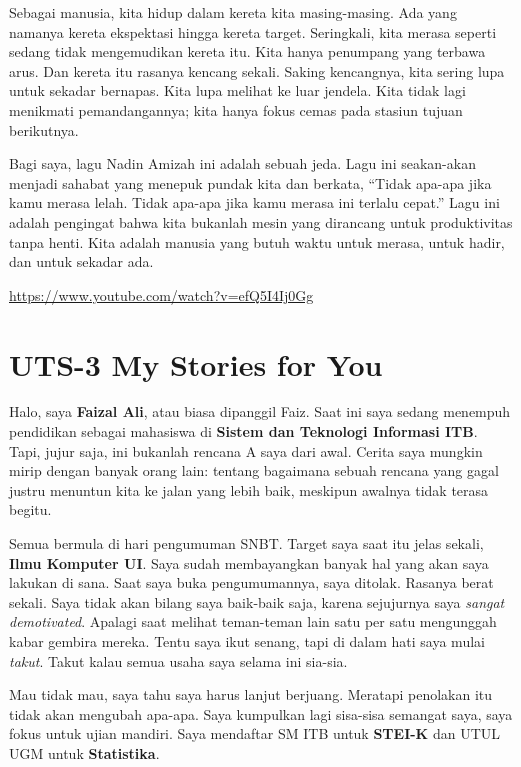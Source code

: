 \documentclass[
  letterpaper,
  DIV=11,
  numbers=noendperiod]{scrreprt}
\begin{document}
Sebagai manusia, kita hidup dalam kereta kita masing-masing. Ada yang
namanya kereta ekspektasi hingga kereta target. Seringkali, kita merasa
seperti sedang tidak mengemudikan kereta itu. Kita hanya penumpang yang
terbawa arus. Dan kereta itu rasanya kencang sekali. Saking kencangnya,
kita sering lupa untuk sekadar bernapas. Kita lupa melihat ke luar
jendela. Kita tidak lagi menikmati pemandangannya; kita hanya fokus
cemas pada stasiun tujuan berikutnya.

Bagi saya, lagu Nadin Amizah ini adalah sebuah jeda. Lagu ini
seakan-akan menjadi sahabat yang menepuk pundak kita dan berkata,
``Tidak apa-apa jika kamu merasa lelah. Tidak apa-apa jika kamu merasa
ini terlalu cepat.'' Lagu ini adalah pengingat bahwa kita bukanlah mesin
yang dirancang untuk produktivitas tanpa henti. Kita adalah manusia yang
butuh waktu untuk merasa, untuk hadir, dan untuk sekadar ada.

\url{https://www.youtube.com/watch?v=efQ5I4Ij0Gg}


\chapter{UTS-3 My Stories for You}\label{uts-3-my-stories-for-you}

Halo, saya \textbf{Faizal Ali}, atau biasa dipanggil Faiz. Saat ini saya
sedang menempuh pendidikan sebagai mahasiswa di \textbf{Sistem dan
Teknologi Informasi ITB}. Tapi, jujur saja, ini bukanlah rencana A saya
dari awal. Cerita saya mungkin mirip dengan banyak orang lain: tentang
bagaimana sebuah rencana yang gagal justru menuntun kita ke jalan yang
lebih baik, meskipun awalnya tidak terasa begitu.

Semua bermula di hari pengumuman SNBT. Target saya saat itu jelas
sekali, \textbf{Ilmu Komputer UI}. Saya sudah membayangkan banyak hal
yang akan saya lakukan di sana. Saat saya buka pengumumannya, saya
ditolak. Rasanya berat sekali. Saya tidak akan bilang saya baik-baik
saja, karena sejujurnya saya \emph{sangat demotivated}. Apalagi saat
melihat teman-teman lain satu per satu mengunggah kabar gembira mereka.
Tentu saya ikut senang, tapi di dalam hati saya mulai \emph{takut}.
Takut kalau semua usaha saya selama ini sia-sia.

Mau tidak mau, saya tahu saya harus lanjut berjuang. Meratapi penolakan
itu tidak akan mengubah apa-apa. Saya kumpulkan lagi sisa-sisa semangat
saya, saya fokus untuk ujian mandiri. Saya mendaftar SM ITB untuk
\textbf{STEI-K} dan UTUL UGM untuk \textbf{Statistika}.
\end{document}
